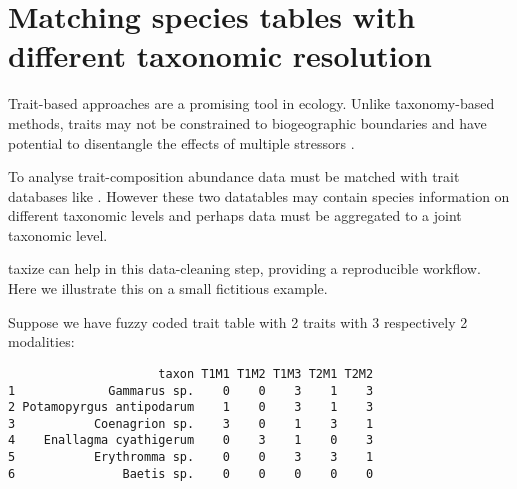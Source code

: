 
\section[Matching species tables]{Matching species tables with different taxonomic resolution} 
\label{ap:taxize:two} 

Trait-based approaches are a promising tool in ecology. Unlike taxonomy-based methods, traits may not be constrained to biogeographic boundaries \citep{baird_toward_2011} and have potential to disentangle the effects of multiple stressors \citep{statzner_can_2010}. 

To analyse trait-composition abundance data must be matched with trait data\-bases like \citep{usseglio-polatera_biological_2000}. However these two datatables may contain species information on different taxonomic levels and perhaps data must be aggregated to a joint taxonomic level.

taxize can help in this data-cleaning step, providing a reproducible workflow. Here we illustrate this on a small fictitious example.

Suppose we have fuzzy coded trait table with 2 traits with 3 respectively 2 modalities:

\begin{knitrout}
\color{fgcolor}\small\begin{kframe}
\begin{alltt}
 \hlkwb{<-} \hlstd{(} \hlstd{=} \hlstd{,}  \hlstd{=} \hlstd{,} \hlstd{=}\hlstd{,}
                       \hlstd{=} \hlstd{))}
\end{alltt}
\begin{verbatim}
                     taxon T1M1 T1M2 T1M3 T2M1 T2M2
1             Gammarus sp.    0    0    3    1    3
2 Potamopyrgus antipodarum    1    0    3    1    3
3           Coenagrion sp.    3    0    1    3    1
4    Enallagma cyathigerum    0    3    1    0    3
5           Erythromma sp.    0    0    3    3    1
6               Baetis sp.    0    0    0    0    0
\end{verbatim}
\end{kframe}
\end{knitrout}


